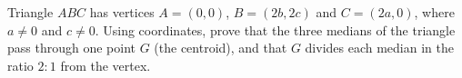 Triangle $ABC$ has vertices $A=(0,0)$, $B=(2b,2c)$ and $C=(2a,0)$, where $a\ne0$ and $c\ne0$. Using coordinates, prove that the three medians of the triangle pass through one point $G$ (the centroid), and that $G$ divides each median in the ratio $2:1$ from the vertex.
